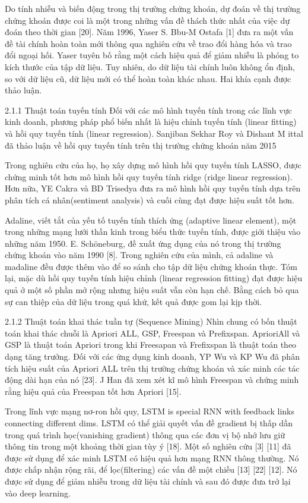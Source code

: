 Do tính nhiễu và biến động trong thị trường chứng khoán, dự đoán về thị trường chứng khoán được coi là một trong những vấn đề thách thức nhất của việc dự đoán theo thời gian [20]. Năm 1996, Yaser S. Bbu-M Ostafa [1] đưa ra một vấn đề tài chính hoàn toàn mới thông qua nghiên cứu về trao đổi hàng hóa và trao đổi ngoại hối. Yaser tuyên bố rằng một cách hiệu quả để giảm nhiễu là phóng to kích thước của tập dữ liệu. Tuy nhiên, do dữ liệu tài chính luôn không ổn định, so với dữ liệu cũ, dữ liệu mới có thể hoàn toàn khác nhau. Hai khía cạnh được thảo luận.

2.1.1 Thuật toán tuyến tính
Đối với các mô hình tuyến tính trong các lĩnh vực kinh doanh, phương pháp phổ biến nhất là hiệu chỉnh
tuyến tính (linear fitting) và hồi quy tuyến tính (linear regression). Sanjiban Sekhar Roy và Dishant M ittal đã thảo luận về hồi quy tuyến tính trên thị trường chứng khoán năm 2015

Trong nghiên cứu của họ, họ xây dựng mô hình hồi quy tuyến tính LASSO, được chứng minh tốt hơn mô hình hồi quy tuyến tính ridge (ridge linear regression). Hơn nữa, YE Cakra và BD Trisedya đưa ra mô hình hồi quy tuyến tính dựa trên phân tích cá nhân(sentiment analysis) và cuối cùng đạt được hiệu suất tốt hơn.

Adaline, viết tắt của yếu tố tuyến tính thích ứng (adaptive linear element), một trong những mạng lưới thần kinh trong biểu thức tuyến tính, được giới thiệu vào những năm 1950. E. Schöneburg, đề xuất ứng dụng của nó trong thị trường chứng khoán vào năm 1990 [8]. Trong nghiên cứu của mình, cả adaline và madaline đều được thêm vào để so sánh cho tập dữ liệu chứng khoán thực. Tóm lại, mặc dù hồi quy tuyến tính hiệu chỉnh (linear regression fitting) đạt được hiệu quả ở một số phần mở rộng nhưng hiệu suất vẫn còn hạn chế. Bằng cách bỏ qua sự can thiệp của dữ liệu trong quá khứ, kết quả được gom lại kịp thời.

2.1.2 Thuật toán khai thác tuần tự (Sequence Mining)
Nhìn chung có bốn thuật toán khai thác chuỗi là Apriori ALL, GSP, Freespan và Prefixspan. AprioriAll và GSP là thuật toán Apriori trong khi Freesapan và Frefixspan là thuật toán theo dạng tăng trưởng. Đối với các ứng dụng kinh doanh, YP Wu và KP Wu đã phân tích hiệu suất của Apriori ALL trên thị trường chứng khoán và xác minh các tác động dài hạn của nó [23]. J Han đã xem xét kĩ mô hình Freespan và chứng minh rằng hiệu quả của Freespan tốt hơn Apriori [15].

Trong lĩnh vực mạng nơ-ron hồi quy, LSTM is special RNN with feedback links connecting different dims. LSTM có thể giải quyết vấn đề gradient bị thấp dần trong quá trình học(vanishing gradient) thông qua các đơn vị bộ nhớ lưu giữ thông tin trong một khoảng thời gian tùy ý [18]. Một số nghiên cứu [3] [11] đã được sử dụng để xác minh LSTM có hiệu quả hơn mạng RNN thông thường. Nó được chấp nhận rộng rãi, để lọc(filtering) các vấn đề một chiều [13] [22] [12]. Nó được sử dụng để giảm nhiễu trong dữ liệu tài chính và sau đó được đưa trở lại vào deep learning.

